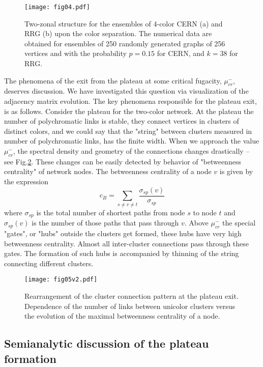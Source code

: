 \documentclass[aps,12pt]{revtex4}
\newcommand{\fig}[1]{Fig.\ref{#1}}
\newcommand{\be}{\begin{equation}}
\newcommand{\ee}{\end{equation}}
\begin{document}
\begin{figure}[ht]
\centerline{\texttt{[image: fig04.pdf]}}
\caption{Two-zonal structure for the ensembles of 4-color CERN (a) and RRG (b) upon the color separation. The numerical data are obtained for ensembles of 250 randomly generated graphs of 256 vertices and with the probability $p=0.15$ for CERN, and $k=38$ for RRG.}
\label{fig:04}
\end{figure}

The phenomena of the exit from the plateau at some critical fugacity, $\mu^{-}_{cr}$, deserves discussion. We have investigated this question via visualization of the adjacency matrix evolution. The key phenomena responsible for the plateau exit, is as follows. Consider the plateau for the two-color network. At the plateau the number of polychromatic links is stable, they connect vertices in clusters of distinct colors, and we could say that the "string" between clusters measured in number of polychromatic links, has the finite width. When we approach the value $\mu^{-}_{cr}$, the spectral density and geometry of the connections changes drastically -- see \fig{fig:05}. These changes can be easily detected by behavior of "betweenness centrality" \cite{centrality} of network nodes. The betweenness centrality of a node $v$  is given by the expression
\be
c_B=\sum_{s\ne v \ne t} \frac{\sigma_{sp}({v})}{\sigma_{sp}}
\ee
where $\sigma_{sp}$ is the total number of shortest paths from node $s$  to node $t$  and $ \sigma_{sp}(v)$ is the number of those paths that pass through $v$. Above $\mu^{-}_{cr}$ the special "gates", or "hubs" outside the clusters get formed, these hubs have very high betweenness centrality. Almost all inter-cluster connections pass through these gates. The formation of such hubs is accompanied by thinning of the string connecting different clusters.

\begin{figure}[ht]
\centerline{\texttt{[image: fig05v2.pdf]}}
\caption{Rearrangement of the cluster connection pattern at the plateau exit. Dependence of the number of links between unicolor clusters versus the evolution of the maximal betweenness centrality of a node. }
\label{fig:05}
\end{figure}

\subsection{Semianalytic discussion of the plateau formation}
\end{document}
